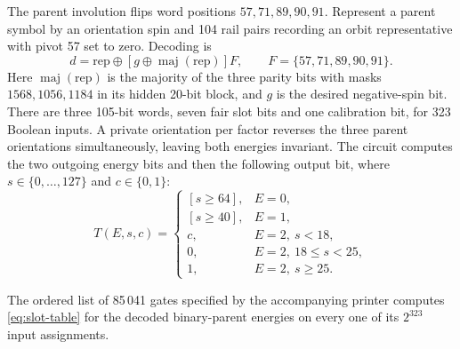 The parent involution flips word positions \(57,71,89,90,91\). Represent a parent symbol by an orientation spin and 104 rail pairs recording an orbit representative with pivot 57 set to zero. Decoding is
\[
 d=\mathrm{rep}\oplus[g\oplus\operatorname{maj}(\mathrm{rep})]F,
 \qquad F=\{57,71,89,90,91\}.
\]
Here \(\operatorname{maj}(\mathrm{rep})\) is the majority of the three parity bits with masks \(1568,1056,1184\) in its hidden 20-bit block, and \(g\) is the desired negative-spin bit. There are three 105-bit words, seven fair slot bits and one calibration bit, for 323 Boolean inputs. A private orientation per factor reverses the three parent orientations simultaneously, leaving both energies invariant. The circuit computes the two outgoing energy bits and then the following output bit, where \(s\in\{0,\ldots,127\}\) and \(c\in\{0,1\}\):
\begin{equation}\label{eq:slot-table}
 T(E,s,c)=
 \begin{cases}
 [s\ge64],&E=0,\\
 [s\ge40],&E=1,\\
 c,&E=2,\ s<18,\\
 0,&E=2,\ 18\le s<25,\\
 1,&E=2,\ s\ge25.
 \end{cases}
\end{equation}

\begin{lemma}\label{lem:circuit-identity}
The ordered list of 85\,041 gates specified by the accompanying printer computes \eqref{eq:slot-table} for the decoded binary-parent energies on every one of its \(2^{323}\) input assignments.
\end{lemma}

